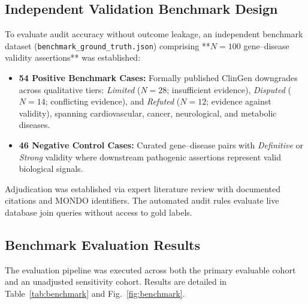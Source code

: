 \documentclass[conference]{IEEEtran}
\begin{document}
\subsection{Independent Validation Benchmark Design}
To evaluate audit accuracy without outcome leakage, an independent benchmark dataset (\texttt{benchmark\_ground\_truth.json}) comprising **$N = 100$ gene--disease validity assertions** was established:
\begin{itemize}
    \item \textbf{54 Positive Benchmark Cases:} Formally published ClinGen downgrades across qualitative tiers: \textit{Limited} ($N = 28$; insufficient evidence), \textit{Disputed} ($N = 14$; conflicting evidence), and \textit{Refuted} ($N = 12$; evidence against validity), spanning cardiovascular, cancer, neurological, and metabolic diseases.
    \item \textbf{46 Negative Control Cases:} Curated gene--disease pairs with \textit{Definitive} or \textit{Strong} validity where downstream pathogenic assertions represent valid biological signals.
\end{itemize}
Adjudication was established via expert literature review with documented citations and MONDO identifiers. The automated audit rules evaluate live database join queries without access to gold labels.

\subsection{Benchmark Evaluation Results}
The evaluation pipeline was executed across both the primary evaluable cohort and an unadjusted sensitivity cohort. Results are detailed in Table~\ref{tab:benchmark} and Fig.~\ref{fig:benchmark}.
\end{document}
